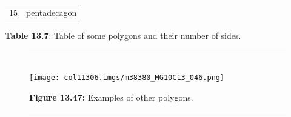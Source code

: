 \begin{table}[H]
{\begin{center}
\begin{xtabular*}{\mytablewidth}[t]{|p{10\mystarwidth}|p{10\mystarwidth}|}
        15 &
    
    
        pentadecagon%
     \tabularnewline{}
    \end{xtabular*}
      \end{center}
    \begin{center}{\small\bfseries Table 13.7}: Table of some polygons and their
number of sides.\end{center}
    
    \addtocounter{footnote}{-0}
    
        }%
      
    \par
  
        
    \setcounter{subfigure}{0}


	\begin{figure}[H] %
    \begin{center}
    \rule[.1in]{\figurerulewidth}{.005in} \\
       
\label{m38380*uid93!!!underscore!!!media}\label{
m38380*uid93!!!underscore!!!printimage}\texttt{[image: 
col11306.imgs/m38380\_MG10C13\_046.png]} %
        
      \vspace{2pt}
    \vspace{\rubberspace}\par \begin{cnxcaption}
	  \small \textbf{Figure 13.47: }Examples of other polygons.
	\end{cnxcaption}
      
    \rule[.1in]{\figurerulewidth}{.005in} \\
        
    \end{center}

 \end{figure}   


\end{table}
